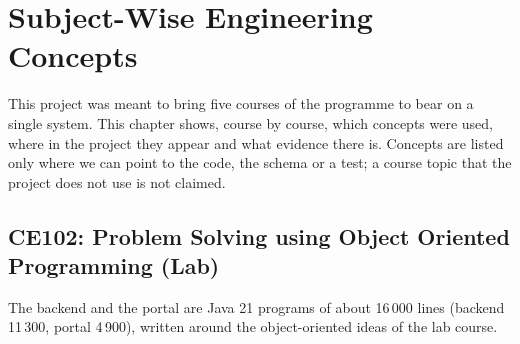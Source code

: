 \chapter{Subject-Wise Engineering Concepts}\label{ch:subjects}
This project was meant to bring five courses of the programme to bear on a single
system. This chapter shows, course by course, which concepts were used, where in the
project they appear and what evidence there is. Concepts are listed only where we can point
to the code, the schema or a test; a course topic that the project does not use is not
claimed.

\section{CE102: Problem Solving using Object Oriented Programming (Lab)}\label{sec:oop}
The backend and the portal are Java 21 programs of about 16\,000 lines (backend 11\,300, portal
4\,900), written around the object-oriented ideas of the lab course.

